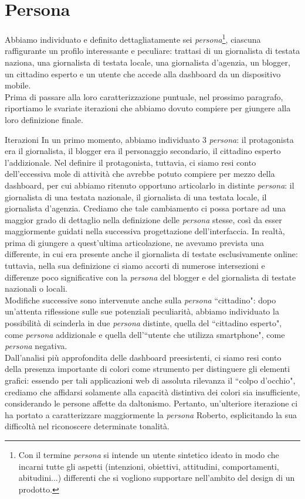 \section{Persona}
\label{s:persona}
Abbiamo individuato e definito dettagliatamente sei \textit{persona}\footnote{Con il termine \textit{persona} si intende un utente sintetico ideato in modo che incarni tutte gli aspetti (intenzioni, obiettivi, attitudini, comportamenti, abitudini...) differenti che si vogliono supportare nell'ambito del design di un prodotto.}, ciascuna raffigurante un profilo interessante e peculiare: trattasi di un giornalista di testata naziona, una giornalista di testata locale, una giornalista d'agenzia, un blogger, un cittadino esperto e un utente che accede alla dashboard da un dispositivo mobile.\\
Prima di passare alla loro caratterizzazione puntuale, nel prossimo paragrafo, riportiamo le svariate iterazioni che abbiamo dovuto compiere per giungere alla loro definizione finale.

\begin{bclogo}{Iterazioni}
    In un primo momento, abbiamo individuato 3 \textit{persona}: il protagonista era il giornalista, il blogger era il personaggio secondario, il cittadino esperto l'addizionale. Nel definire il protagonista, tuttavia, ci siamo resi conto dell'eccessiva mole di attività che avrebbe potuto compiere per mezzo della dashboard, per cui abbiamo ritenuto opportuno articolarlo in distinte \textit{persona}: il giornalista di una testata nazionale, il giornalista di una testata locale, il giornalista d'agenzia. Crediamo che tale cambiamento ci possa portare ad una maggior grado di dettaglio nella definizione delle \textit{persona} stesse, così da esser maggiormente guidati nella successiva progettazione dell'interfaccia.
    \noindent
    In realtà, prima di giungere a quest'ultima articolazione, ne avevamo prevista una differente, in cui era presente anche il giornalista di testate esclusivamente online: tuttavia, nella sua definizione ci siamo accorti di numerose intersezioni e differenze poco significative con la \textit{persona} del blogger e del giornalista di testate nazionali o locali. \\ 
    Modifiche successive sono intervenute anche sulla \textit{persona} ``cittadino": dopo un'attenta riflessione sulle sue potenziali peculiarità, abbiamo individuato la possibilità di scinderla in due \textit{persona} distinte, quella del ``cittadino esperto", come \textit{persona} addizionale e quella dell'``utente che utilizza smartphone", come \textit{persona} negativa.\\
    Dall'analisi più approfondita delle dashboard preesistenti, ci siamo resi conto della presenza importante di colori come strumento per distinguere gli elementi grafici: essendo per tali applicazioni web di assoluta rilevanza il ``colpo d'occhio", crediamo che affidarsi solamente alla capacità distintiva dei colori sia insufficiente, considerando le persone affette da daltonismo. Pertanto, un'ulteriore iterazione ci ha portato a caratterizzare maggiormente la \textit{persona} Roberto, esplicitando la sua difficoltà nel riconoscere determinate tonalità.
\end{bclogo}    


